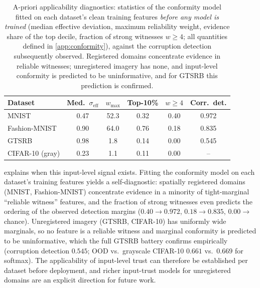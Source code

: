 \begin{table}[ht]
\centering
\setlength{\tabcolsep}{4.5pt}
\begin{tabular}{lccccc}
\toprule
Dataset & Med.\ $\sigma_{\mathrm{eff}}$ & $w_{\max}$ & Top-10\% & $w{\geq}4$ & Corr.\ det. \\
\midrule
MNIST & 0.47 & 52.3 & 0.32 & 0.40 & 0.972 \\
Fashion-MNIST & 0.90 & 64.0 & 0.76 & 0.18 & 0.835 \\
GTSRB & 0.98 & 1.8 & 0.14 & 0.00 & 0.545 \\
CIFAR-10 (gray) & 0.23 & 1.1 & 0.11 & 0.00 & -- \\
\bottomrule
\end{tabular}
\caption{A-priori applicability diagnostics: statistics of the conformity model fitted on each dataset's clean training features \emph{before any model is trained} (median effective deviation, maximum reliability weight, evidence share of the top decile, fraction of strong witnesses $w \geq 4$; all quantities defined in \cref{app:conformity}), against the corruption detection subsequently observed. Registered domains concentrate evidence in reliable witnesses; unregistered imagery has none, and input-level conformity is predicted to be uninformative, and for GTSRB this prediction is confirmed.}
\label{tab:diagnostics}
\end{table}

 explains when this input-level signal exists. Fitting the conformity model on each dataset's training features yields a self-diagnostic: spatially registered domains (MNIST, Fashion-MNIST) concentrate evidence in a minority of tight-marginal ``reliable witness'' features, and the fraction of strong witnesses even predicts the ordering of the observed detection margins ($0.40 \to 0.972$, $0.18 \to 0.835$, $0.00 \to$ chance). Unregistered imagery (GTSRB, CIFAR-10) has uniformly wide marginals, so no feature is a reliable witness and marginal conformity is predicted to be uninformative, which the full GTSRB battery confirms empirically (corruption detection $0.545$; OOD vs.\ grayscale CIFAR-10 $0.661$ vs.\ $0.669$ for softmax). The applicability of input-level trust can therefore be established per dataset before deployment, and richer input-trust models for unregistered domains are an explicit direction for future work.

